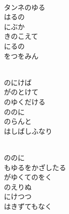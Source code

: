 \documentclass[10pt,b5j]{tarticle} %
\begin{document}
\vspace{1.5em} %
\newcommand{\linespace}{0.5em} %
\newcommand{\blocksize}{0.5\hsize} %
\newcommand{\itemmargin}{3em} %
\begin{enumerate} %
    \setlength{\itemindent}{\itemmargin} %
    \begin{minipage}[c]{\blocksize}
    
        \vspace{\linespace}
        \item~\\
        タンネのゆる\\
        はるの\\
        にぶか\\
        きのこえて\\
        にるの\\
        をつをみん
        
    \end{minipage}
    \begin{minipage}[c]{\blocksize}
        
        \vspace{\linespace}
        \item~\\
        のにけば\\
        がのとけて\\
        のゆくだける\\
        ののに\\
        のらんと\\
        はしばしふなり
        
    \end{minipage}
    \begin{minipage}[c]{\blocksize}
        
        \vspace{\linespace}
        \item~\\
        ののに\\
        もゆるをかざしたる\\
        がゆくてのをく\\
        のえりぬ\\
        にけつつ\\
        はきずてもなく
        

\end{minipage}
\end{enumerate}
\end{document}

